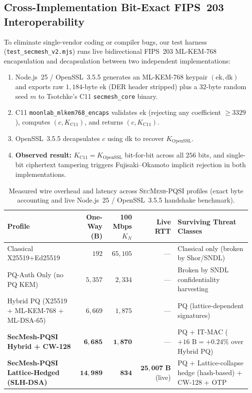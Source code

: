 \documentclass[11pt,reqno]{amsart}
\newcommand{\code}[1]{\texttt{\small #1}}
\begin{document}
\subsection*{Cross-Implementation Bit-Exact FIPS~203 Interoperability}
To eliminate single-vendor coding or compiler bugs, our test harness (\code{test\_secmesh\_v2.mjs}) runs live bidirectional FIPS~203 ML-KEM-768 encapsulation and decapsulation between two independent implementations:
\begin{enumerate}[leftmargin=1.8em]
  \item Node.js~25 / OpenSSL~3.5.5 generates an ML-KEM-768 keypair $(\mathrm{ek}, \mathrm{dk})$ and exports raw $1{,}184$-byte $\mathrm{ek}$ (DER header stripped) plus a $32$-byte random seed $m$ to Tsotchke's C11 \code{secmesh\_core} binary.
  \item C11 \code{moonlab\_mlkem768\_encaps} validates $\mathrm{ek}$ (rejecting any coefficient $\ge 3329$), computes $(c, K_{\mathrm{C11}})$, and returns $(c, K_{\mathrm{C11}})$.
  \item OpenSSL~3.5.5 decapsulates $c$ using $\mathrm{dk}$ to recover $K_{\mathrm{OpenSSL}}$.
  \item \textbf{Observed result:} $K_{\mathrm{C11}} = K_{\mathrm{OpenSSL}}$ bit-for-bit across all $256$ bits, and single-bit ciphertext tampering triggers Fujisaki--Okamoto implicit rejection in both implementations.
\end{enumerate}

\begin{table}[t]
\centering
\caption{Measured wire overhead and latency across \textsc{SecMesh-PQSI} profiles (exact byte accounting and live Node.js~25 / OpenSSL~3.5.5 handshake benchmark).}
\label{tab:wire}
\scriptsize
\setlength{\tabcolsep}{4pt}
\begin{tabularx}{\linewidth}{@{} >{\RaggedRight\arraybackslash}p{3.6cm} r r r Y @{}}
\toprule
\textbf{Profile} & \textbf{One-Way (B)} & \textbf{100 Mbps $K_N$} & \textbf{Live RTT} & \textbf{Surviving Threat Classes} \\
\midrule
Classical X25519+Ed25519 & $192$ & $65{,}105$ & --- & Classical only (broken by Shor/SNDL) \\
PQ-Auth Only (no PQ KEM) & $5{,}357$ & $2{,}334$ & --- & Broken by SNDL confidentiality harvesting \\
Hybrid PQ (X25519 + ML-KEM-768 + ML-DSA-65) & $6{,}669$ & $1{,}875$ & --- & PQ (lattice-dependent signatures) \\
\textbf{SecMesh-PQSI Hybrid + CW-128} & $\mathbf{6{,}685}$ & $\mathbf{1{,}870}$ & --- & PQ + IT-MAC ($+16\text{ B} = +0.24\%$ over Hybrid PQ) \\
\textbf{SecMesh-PQSI Lattice-Hedged (SLH-DSA)} & $\mathbf{14{,}989}$ & $\mathbf{834}$ & $\mathbf{25{,}007\text{ B}}$ (live) & PQ + Lattice-collapse hedge (hash-based) + CW-128 + OTP \\
\bottomrule
\end{tabularx}
\end{table}
\end{document}
